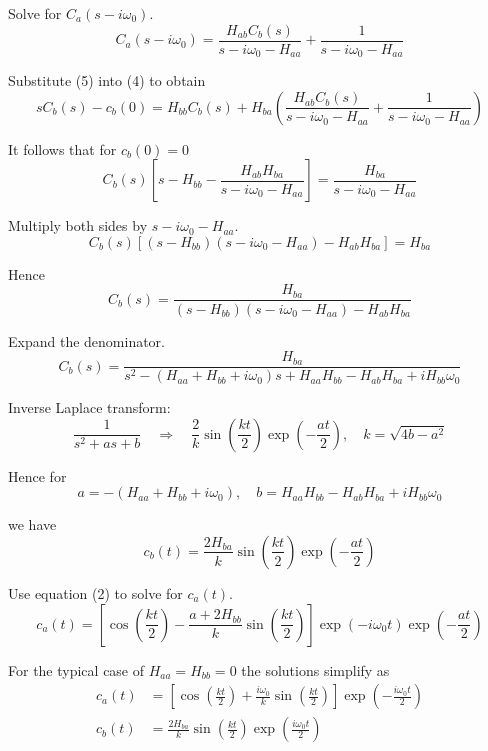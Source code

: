 Solve for $C_a(s-i\omega_0)$.
\begin{equation*}
C_a(s-i\omega_0)=\frac{H_{ab}C_b(s)}{s-i\omega_0-H_{aa}}+\frac{1}{s-i\omega_0-H_{aa}}
\tag{5}
\end{equation*}

Substitute (5) into (4) to obtain
\begin{equation*}
sC_b(s)-c_b(0)=H_{bb}C_b(s)+H_{ba}
\left(
\frac{H_{ab}C_b(s)}{s-i\omega_0-H_{aa}}+\frac{1}{s-i\omega_0-H_{aa}}
\right)
\end{equation*}

It follows that for $c_b(0)=0$
\begin{equation*}
C_b(s)\left[s-H_{bb}-\frac{H_{ab}H_{ba}}{s-i\omega_0-H_{aa}}\right]=\frac{H_{ba}}{s-i\omega_0-H_{aa}}
\end{equation*}

Multiply both sides by $s-i\omega_0-H_{aa}$.
\begin{equation*}
C_b(s)\left[(s-H_{bb})(s-i\omega_0-H_{aa})-H_{ab}H_{ba}\right]=H_{ba}
\end{equation*}

Hence
\begin{equation*}
C_b(s)=\frac{H_{ba}}{(s-H_{bb})(s-i\omega_0-H_{aa})-H_{ab}H_{ba}}
\end{equation*}

Expand the denominator.
\begin{equation*}
C_b(s)=\frac{H_{ba}}{s^2-(H_{aa}+H_{bb}+i\omega_0)s+H_{aa}H_{bb}-H_{ab}H_{ba}+iH_{bb}\omega_0}
\end{equation*}

Inverse Laplace transform:
\begin{equation*}
\frac{1}{s^2+as+b}\quad\Rightarrow\quad
\frac{2}{k}\sin\left(\frac{kt}{2}\right)\exp\left(-\frac{at}{2}\right),\quad
k=\sqrt{4b-a^2}
\end{equation*}

Hence for
\begin{equation*}
a=-(H_{aa}+H_{bb}+i\omega_0),\quad
b=H_{aa}H_{bb}-H_{ab}H_{ba}+iH_{bb}\omega_0
\end{equation*}

we have
\begin{equation*}
c_b(t)=\frac{2H_{ba}}{k}
\sin\left(\frac{kt}{2}\right)
\exp\left(-\frac{at}{2}\right)
\end{equation*}

Use equation (2) to solve for $c_a(t)$.
\begin{equation*}
c_a(t)=\left[
\cos\left(\frac{kt}{2}\right)-\frac{a+2H_{bb}}{k}\sin\left(\frac{kt}{2}\right)
\right]\exp(-i\omega_0t)\exp\left(-\frac{at}{2}\right)
\end{equation*}

For the typical case of $H_{aa}=H_{bb}=0$ the solutions simplify as
\begin{align*}
c_a(t)&=\left[\cos\left(\frac{kt}{2}\right)+\frac{i\omega_0}{k}\sin\left(\frac{kt}{2}\right)\right]
\exp\left(-\frac{i\omega_0t}{2}\right)
\tag{6}
\\[1ex]
c_b(t)&=\frac{2H_{ba}}{k}\sin\left(\frac{kt}{2}\right)\exp\left(\frac{i\omega_0t}{2}\right)
\tag{7}
\end{align*}


